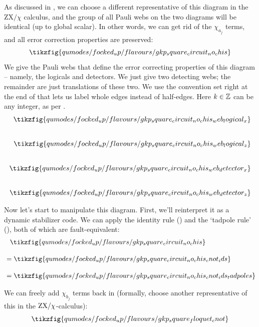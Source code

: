 As discussed in , we can choose a different representative of this diagram in the $\text{ZX}/\chi$ calculus, and the group of all Pauli webs on the two diagrams will be identical (up to global scalar).
In other words, we can get rid of the $\chi_{a_j}$ terms, and all error correction properties are preserved:
\begin{equation}
    \tikzfig{qumodes/focked_up/flavours/gkp_square_circuit_no_chis}
\end{equation}
We give the Pauli webs that define the error correcting properties of this diagram -- namely, the logicals and detectors.
We just give two detecting webs; the remainder are just translations of these two.
We use the convention set right at the end of  that lets us label whole edges instead of half-edges.
Here $k \in\mathbb{Z}$ can be any integer, as per .
\begin{align}\label{al:gkp_square_circuit_no_chis_webs}
    \tikzfig{qumodes/focked_up/flavours/gkp_square_circuit_no_chis_web_logical_x} \\[20pt]
    \tikzfig{qumodes/focked_up/flavours/gkp_square_circuit_no_chis_web_logical_z} \\[20pt]
    \tikzfig{qumodes/focked_up/flavours/gkp_square_circuit_no_chis_web_detector_x} \\[20pt]
    \tikzfig{qumodes/focked_up/flavours/gkp_square_circuit_no_chis_web_detector_z}
\end{align}

Now let's start to manipulate this diagram.
First, we'll reinterpret it as a dynamic stabilizer code.
We can apply the identity rule () and the `tadpole rule' (), both of which are fault-equivalent:
\begin{equation}
    \begin{aligned}
        &\phantom{=} \tikzfig{qumodes/focked_up/flavours/gkp_square_circuit_no_chis} \\[10pt]
        &= \tikzfig{qumodes/focked_up/flavours/gkp_square_circuit_no_chis_cnot_ids} \\[10pt]
        &= \tikzfig{qumodes/focked_up/flavours/gkp_square_circuit_no_chis_cnot_ids_tadpoles}
    \end{aligned}
\end{equation}

We can freely add $\chi_{b_j}$ terms back in (formally, choose another representative of this in the $\text{ZX}/\chi$-calculus):
\begin{equation}
    \tikzfig{qumodes/focked_up/flavours/gkp_square_floquet_cnot}
\end{equation}

